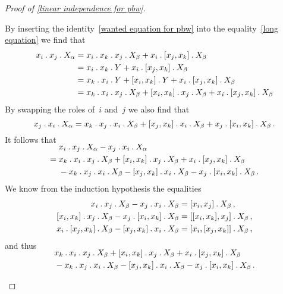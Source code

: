 \begin{proof}[Proof of \cref{linear independence for pbw}]
\begin{casedistinction}
			By inserting the identity~\eqref{wanted equation for pbw} into the equality~\eqref{long equation} we find that
			\begin{align*}
				x_i \mathbin{.} x_j \mathbin{.} X_\alpha
				&=
				x_i \mathbin{.} x_k \mathbin{.} x_j \mathbin{.} X_\beta
				+ x_i \mathbin{.} [x_j, x_k] \mathbin{.} X_\beta
				\\
				&=
				x_i \mathbin{.} x_k \mathbin{.} Y
				+ x_i \mathbin{.} [x_j, x_k] \mathbin{.} X_\beta
				\\
				&=
				x_k \mathbin{.} x_i \mathbin{.} Y
				+ [x_i, x_k] \mathbin{.} Y
				+ x_i \mathbin{.} [x_j, x_k] \mathbin{.} X_\beta
				\\
				&=
				x_k \mathbin{.} x_i \mathbin{.} x_j \mathbin{.} X_\beta
				+ [x_i, x_k] \mathbin{.} x_j \mathbin{.} X_\beta
				+ x_i \mathbin{.} [x_j, x_k] \mathbin{.} X_\beta
			\end{align*}
			By swapping the roles of~$i$ and~$j$ we also find that
			\[
				x_j \mathbin{.} x_i \mathbin{.} X_\alpha
				=
				x_k \mathbin{.} x_j \mathbin{.} x_i \mathbin{.} X_\beta
				+ [x_j, x_k] \mathbin{.} x_i \mathbin{.} X_\beta
				+ x_j \mathbin{.} [x_i, x_k] \mathbin{.} X_\beta \,.
			\]
			It follows that
			\begin{align*}
				\SwapAboveDisplaySkip
				{}&
				x_i \act x_j \act X_\alpha
				- x_j \act x_i \act X_\alpha
				\\
				={}&
				x_k \act x_i \act x_j \act X_\beta
				+ [x_i, x_k] \act x_j \act X_\beta
				+ x_i \act [x_j, x_k] \act X_\beta
				\\
				{}&
				- x_k \act x_j \act x_i \act X_\beta
				- [x_j, x_k] \act x_i \act X_\beta
				- x_j \act [x_i, x_k] \act X_\beta \,.
			\end{align*}
			We know from the induction hypothesis the equalities
			\begin{align*}
				x_i \mathbin{.} x_j \mathbin{.} X_\beta
				- x_j \mathbin{.} x_i \mathbin{.} X_\beta
				&=
				[x_i, x_j] \mathbin{.} X_\beta \,,
				\\
				[x_i, x_k] \mathbin{.} x_j \mathbin{.} X_\beta
				- x_j \mathbin{.} [x_i, x_k] \mathbin{.} X_\beta
				&=
				[ [x_i, x_k], x_j ] \mathbin{.} X_\beta \,,
				\\
				x_i \mathbin{.} [x_j, x_k] \mathbin{.} X_\beta
				- [x_j, x_k] \mathbin{.} x_i \mathbin{.} X_\beta
				&=
				[ x_i, [x_j, x_k] ] \mathbin{.} X_\beta \,,
			\end{align*}
			and thus
			\begin{align*}
				\SwapAboveDisplaySkip
				{}&
				x_k \act x_i \act x_j \act X_\beta
				+ [x_i, x_k] \act x_j \act X_\beta
				+ x_i \act [x_j, x_k] \act X_\beta
				\\
				{}&
				- x_k \act x_j \act x_i \act X_\beta
				- [x_j, x_k] \act x_i \act X_\beta
				- x_j \act [x_i, x_k] \act X_\beta \,.
				\\

\end{align*}
\end{casedistinction}
\end{proof}

